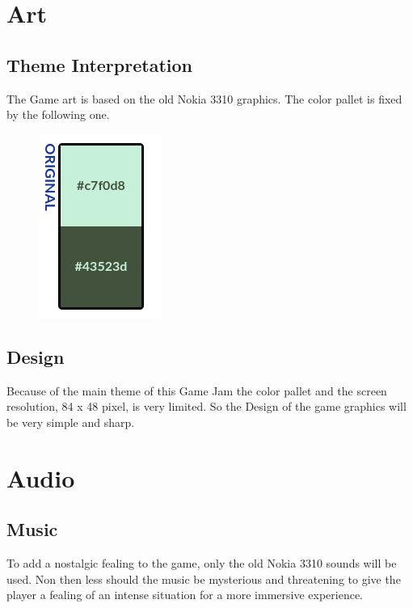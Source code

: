 \documentclass[12pt, a4paper]{article}
\begin{document}
{    \section{Art}

        \subsection{Theme Interpretation} %
            The Game art is based on the old Nokia 3310 graphics.
            The color pallet is fixed by the following one.
            \begin{figure}[h]
                \centering
                \includegraphics[scale=0.7, angle=90]{./images/colorpallet.png}
            \end{figure} 

        \subsection{Design}
            Because of the main theme of this Game Jam the color 
            pallet and the screen resolution, 84 x 48 pixel, is very limited.
            So the Design of the game graphics will be very simple and sharp.

    \section{Audio}

        \subsection{Music}
            To add a nostalgic fealing to the game, only the old Nokia 3310
            sounds will be used. Non then less should the music be mysterious
            and threatening to give the player a fealing of an intense 
            situation for a more immersive experience.

}
\end{document}
